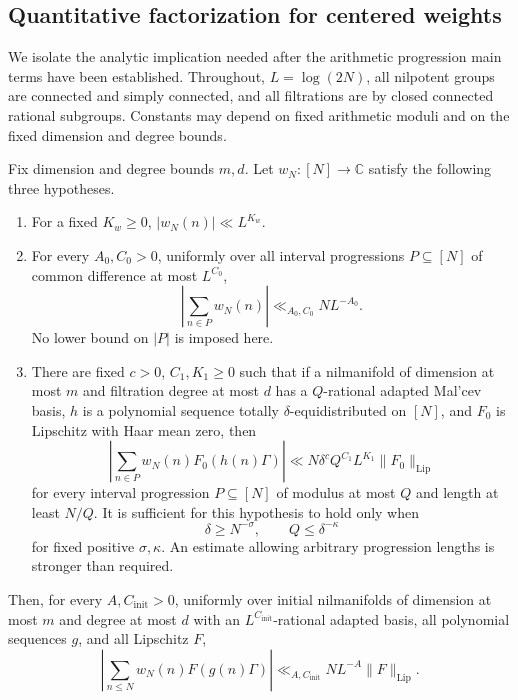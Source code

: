 \subsection{Quantitative factorization for centered weights}
\label{sec:gf-factorization}

We isolate the analytic implication needed after the arithmetic
progression main terms have been established. Throughout,
$L=\log(2N)$, all nilpotent groups are connected and simply connected,
and all filtrations are by closed connected rational subgroups. Constants
may depend on fixed arithmetic moduli and on the fixed dimension and
degree bounds.

\begin{proposition}\label{prop:gf-factorization}
Fix dimension and degree bounds $m,d$. Let $w_N:[N]\to\mathbb C$ satisfy
the following three hypotheses.
\begin{enumerate}
\item For a fixed $K_w\geq0$, $|w_N(n)|\ll L^{K_w}$.
\item For every $A_0,C_0>0$, uniformly over all interval progressions
$P\subseteq[N]$ of common difference at most $L^{C_0}$,
\begin{equation}\label{eq:gf-sw}
 \left|\sum_{n\in P}w_N(n)\right|
       \ll_{A_0,C_0}N L^{-A_0}.
\end{equation}
No lower bound on $|P|$ is imposed here.
\item There are fixed $c>0$, $C_1,K_1\geq0$ such that if a nilmanifold
of dimension at most $m$ and filtration degree at most $d$ has a
$Q$-rational adapted Mal'cev basis, $h$ is a polynomial sequence totally
$\delta$-equidistributed on $[N]$, and $F_0$ is Lipschitz with Haar mean
zero, then
\begin{equation}\label{eq:gf-ma}
 \left|\sum_{n\in P}w_N(n)F_0(h(n)\Gamma)\right|
 \ll N\delta^c Q^{C_1}L^{K_1}\|F_0\|_{\mathrm{Lip}}
\end{equation}
for every interval progression $P\subseteq[N]$ of modulus at most $Q$
and length at least $N/Q$. It is sufficient for this hypothesis to hold
only when
\begin{equation}\label{eq:gf-ma-regime}
 \delta\geq N^{-\sigma},\qquad Q\leq\delta^{-\kappa}
\end{equation}
for fixed positive $\sigma,\kappa$. An estimate allowing arbitrary
progression lengths is stronger than required.
\end{enumerate}
Then, for every $A,C_{\mathrm{init}}>0$, uniformly over initial
nilmanifolds of dimension at most $m$ and degree at most $d$ with an
$L^{C_{\mathrm{init}}}$-rational adapted basis, all polynomial sequences
$g$, and all Lipschitz $F$,
\begin{equation}\label{eq:gf-conclusion}
 \left|\sum_{n\leq N}w_N(n)F(g(n)\Gamma)\right|
     \ll_{A,C_{\mathrm{init}}}N L^{-A}\|F\|_{\mathrm{Lip}}.
\end{equation}
\end{proposition}

